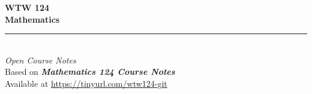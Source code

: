\begin{titlepage}

    \vspace*{4cm}

    \begin{center}
        {\Huge \bfseries WTW 124}\\[0.5cm]
        {\Huge \bfseries Mathematics}\\[1.5cm]
        
        \rule{\textwidth}{0.4pt}\\[1.5cm]

    
        {\normalsize \textit{Open Course Notes}}\\[1.5cm]
        {\normalsize Based on \textit{\textbf{Mathematics 124 Course Notes}}}\\[3cm]

        {\footnotesize Available at \url{https://tinyurl.com/wtw124-git}}
    \end{center}
\end{titlepage}

\tableofcontents
\newpage
